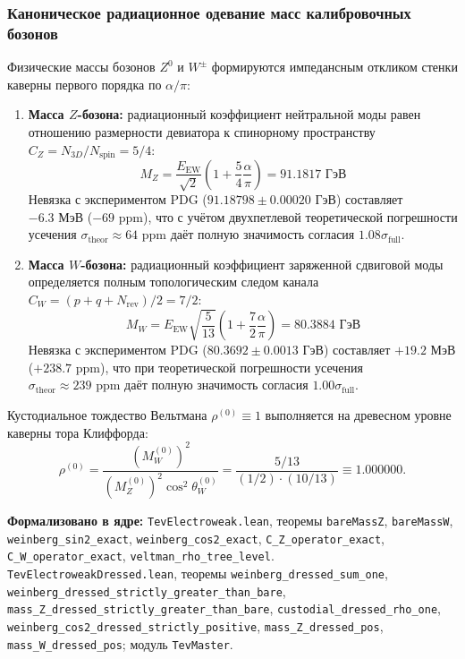 \documentclass[11pt,a4paper]{article}
\theoremstyle{definition}
\theoremstyle{remark}
\begin{document}
\subsubsection{Каноническое радиационное одевание масс калибровочных бозонов}

Физические массы бозонов $Z^0$ и $W^\pm$ формируются импедансным откликом стенки каверны первого порядка по $\alpha/\pi$:
\begin{enumerate}
    \item \textbf{Масса $Z$-бозона:} радиационный коэффициент нейтральной моды равен отношению размерности девиатора к спинорному пространству $C_Z = N_{3D} / N_{\mathrm{spin}} = 5/4$:
    \begin{equation}
    M_Z = \frac{E_{\mathrm{EW}}}{\sqrt{2}} \left(1 + \frac{5}{4} \frac{\alpha}{\pi}\right) = 91.1817\text{ ГэВ}
    \end{equation}
    Невязка с экспериментом PDG ($91.18798 \pm 0.00020\text{ ГэВ}$) составляет $-6.3\text{ МэВ}$ ($-69\text{ ppm}$), что с учётом двухпетлевой теоретической погрешности усечения $\sigma_{\mathrm{theor}} \approx 64\text{ ppm}$ даёт полную значимость согласия $1.08\sigma_{\mathrm{full}}$.

    \item \textbf{Масса $W$-бозона:} радиационный коэффициент заряженной сдвиговой моды определяется полным топологическим следом канала $C_W = (p + q + N_{\mathrm{rev}})/2 = 7/2$:
    \begin{equation}
    M_W = E_{\mathrm{EW}} \sqrt{\frac{5}{13}} \left(1 + \frac{7}{2} \frac{\alpha}{\pi}\right) = 80.3884\text{ ГэВ}
    \end{equation}
    Невязка с экспериментом PDG ($80.3692 \pm 0.0013\text{ ГэВ}$) составляет $+19.2\text{ МэВ}$ ($+238.7\text{ ppm}$), что при теоретической погрешности усечения $\sigma_{\mathrm{theor}} \approx 239\text{ ppm}$ даёт полную значимость согласия $1.00\sigma_{\mathrm{full}}$.
\end{enumerate}

Кустодиальное тождество Вельтмана $\rho^{(0)} \equiv 1$ выполняется на древесном уровне каверны тора Клиффорда:
\begin{equation}
\rho^{(0)} = \frac{(M_W^{(0)})^2}{(M_Z^{(0)})^2 \cos^2\theta_W^{(0)}} = \frac{5/13}{(1/2) \cdot (10/13)} \equiv \mathbf{1.000000}.
\end{equation}

\noindent\small\textbf{Формализовано в ядре:} \texttt{TevElectroweak.lean}, теоремы \texttt{bareMassZ}, \texttt{bareMassW}, \texttt{weinberg\_sin2\_exact}, \texttt{weinberg\_cos2\_exact}, \texttt{C\_Z\_operator\_exact}, \texttt{C\_W\_operator\_exact}, \texttt{veltman\_rho\_tree\_level}.\\ \texttt{TevElectroweakDressed.lean}, теоремы \texttt{weinberg\_dressed\_sum\_one}, \texttt{weinberg\_dressed\_strictly\_greater\_than\_bare}, \texttt{mass\_Z\_dressed\_strictly\_greater\_than\_bare}, \texttt{custodial\_dressed\_rho\_one},\\ \texttt{weinberg\_cos2\_dressed\_strictly\_positive}, \texttt{mass\_Z\_dressed\_pos}, \texttt{mass\_W\_dressed\_pos}; модуль \texttt{TevMaster}.
\end{document}
